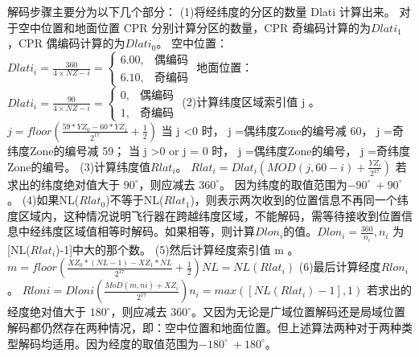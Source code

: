 解码步骤主要分为以下几个部分：\newline 
(1)将经纬度的分区的数量 Dlati 计算出来。\newline 
对于空中位置和地面位置 CPR 分别计算分区的数量，CPR 奇编码计算的为$Dlati_1$ ，CPR 偶编码计算的为$Dlati_0$。\newline
空中位置：	
$Dlati_i=\frac{360}{4\times NZ-i}= \begin{cases} 6.00, & \mbox{偶编码} \\ 6.10, & \mbox{奇编码} \end{cases}$\newline
地面位置：
$Dlati_i=\frac{90}{4\times NZ-i}= \begin{cases} 0, & \mbox{偶编码} \\ 1, & \mbox{奇编码} \end{cases}$\newline
(2)计算纬度区域索引值 j 。\newline
$j = floor(\frac{59*YZ_0-60*YZ_1}{2^{17}} + \frac{1}{2})$\newline
当 j <0 时， j =偶纬度Zone的编号减 60， j =奇纬度Zone的编号减 59；\newline 
当 j >0 or j = 0 时， j =偶纬度Zone的编号， j =奇纬度Zone的编号。 \newline
(3)计算纬度值$Rlat_i$。\newline
$Rlat_i = Dlat_i(MOD(j,60-i)+\frac{YZ_i}{2^{17}})$\newline
若求出的纬度绝对值大于 $90^{\circ}$，则应减去 $360^{\circ}$。  因为纬度的取值范围为$-90^{\circ} ~ +90^{\circ}$。\newline 
(4)如果NL($Rlat_0$)不等于NL($Rlat_1$)，则表示两次收到的位置信息不再同一个纬度区域内，这种情况说明飞行器在跨越纬度区域，不能解码，需等待接收到位置信息中经纬度区域值相等时解码。如果相等，则计算$Dlon_i$的值。$Dlon_i = \frac{360}{n_i}, n_i$ 为[NL($Rlat_i$)-1]中大的那个数。\newline 
(5)然后计算经度索引值 m 。\newline
$m = floor(\frac{XZ_0*(NL-1)-XZ_1*NL}{2^{17}}+\frac{1}{2})NL=NL(Rlat_i)$\newline
(6)最后计算经度$Rlon_i$。\newline
$Rloni=Dloni(\frac{MoD(m,ni)+XZ_i}{2^{17}})n_i = max([NL(Rlat_i)-1],1)$\newline
若求出的经度绝对值大于 $180^{\circ}$，则应减去 $360^{\circ}$。又因为无论是广域位置解码还是局域位置解码都仍然存在两种情况，即：空中位置和地面位置。但上述算法两种对于两种类型解码均适用。因为经度的取值范围为$-180^{\circ} ~ +180^{\circ}$。

